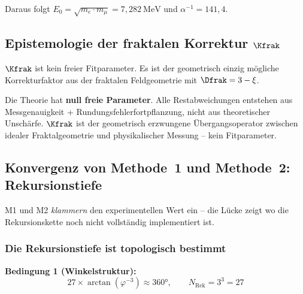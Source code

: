 Daraus folgt $E_0 = \sqrt{m_e \cdot m_\mu} = 7{,}282\ \text{MeV}$ und $\alpha^{-1} = 141{,}4$.

\subsection{Epistemologie der fraktalen Korrektur $\Kfrak$}

$\Kfrak$ ist kein freier Fitparameter. Es ist der geometrisch einzig mögliche Korrekturfaktor aus der fraktalen Feldgeometrie mit $\Dfrak = 3 - \xi$.

\begin{keyresult}
Die Theorie hat \textbf{null freie Parameter}. Alle Restabweichungen entstehen aus Messgenauigkeit + Rundungsfehlerfortpflanzung, nicht aus theoretischer Unschärfe. $\Kfrak$ ist der geometrisch erzwungene Übergangsoperator zwischen idealer Fraktalgeometrie und physikalischer Messung -- kein Fitparameter.
\end{keyresult}

\subsection{Konvergenz von Methode~1 und Methode~2: Rekursionstiefe}

\begin{center}
\end{center}

M1 und M2 \emph{klammern} den experimentellen Wert ein -- die Lücke zeigt wo die Rekursionskette noch nicht vollständig implementiert ist.

\subsubsection*{Die Rekursionstiefe ist topologisch bestimmt}

\textbf{Bedingung 1 (Winkelstruktur):}
\[
  27 \times \arctan(\varphi^{-3}) \approx 360°, \qquad N_{\text{Rek}} = 3^3 = 27
\]

